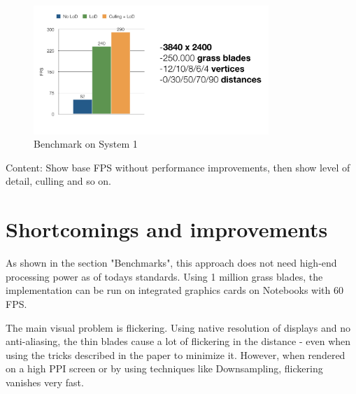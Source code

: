 \documentclass[conference]{acmsiggraph}
\begin{document}
 \begin{figure}[ht]
   \centering
   \includegraphics[width=3.5in]{images/benchmark1}
   \caption{Benchmark on System 1}
 \end{figure}    

Content: Show base FPS without performance improvements, then show level of detail, culling and so on.

\section{Shortcomings and improvements}

As shown in the section "Benchmarks", this approach does not need high-end processing power as of todays standards. Using 1 million grass blades, the implementation can be run on integrated graphics cards on Notebooks with 60 FPS.

The main visual problem is flickering. Using native resolution of displays and no anti-aliasing, the thin blades cause a lot of flickering in the distance - even when using the tricks described in the paper to minimize it. However, when rendered on a high PPI screen or by using techniques like Downsampling, flickering vanishes very fast.



\end{document}
